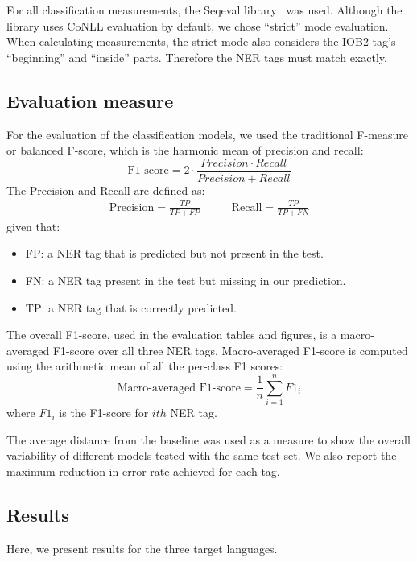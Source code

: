 \documentclass[11pt]{article}
\begin{document}
For all classification measurements, the Seqeval library~\cite{seqeval} was used.
Although the library uses CoNLL evaluation by default, we chose ``strict'' mode evaluation.
When calculating measurements, the strict mode also considers the IOB2 tag's ``beginning'' and ``inside'' parts.
Therefore the NER tags must match exactly.

\subsection{Evaluation measure}
For the evaluation of the classification models, we used the traditional F-measure or balanced F-score, which is the harmonic mean of precision and recall:
\begin{equation*}
    \text{F1-score} = 2  \cdot \frac{Precision \cdot Recall}{Precision +  Recall}
\end{equation*}
The Precision and Recall are defined as:
\begin{equation*}
\begin{split}
    \text{Precision} = \frac{TP}{TP + FP}
\end{split}
\quad\quad
\begin{split}
    \text{Recall} = \frac{TP}{TP + FN}
\end{split}
\end{equation*}
given that:
\begin{itemize}
  \item FP: a NER tag that is predicted but not present in the test.
  \item FN: a NER tag present in the test but missing in our prediction.
  \item TP: a NER tag that is correctly predicted.
\end{itemize}

The overall F1-score, used in the evaluation tables and figures, is a macro-averaged F1-score over all three NER tags. 
Macro-averaged F1-score is computed using the arithmetic mean of all the per-class F1 scores:
\begin{equation*}
    \text{Macro-averaged F1-score} = \frac{1}{n}\sum_{i=1}^{n} F1_i
\end{equation*}
where $F1_i$ is the F1-score for $ith$ NER tag.

The average distance from the baseline was used as a measure to show the overall variability of different models tested with the same test set. We also report the maximum reduction in error rate achieved for each tag.

\subsection{Results}
Here, we present results for the three target languages.
\end{document}
